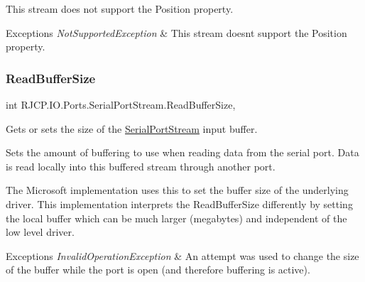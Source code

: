 This stream does not support the Position property. 


\begin{DoxyExceptions}{Exceptions}
{\em Not\+Supported\+Exception} & This stream doesn\textquotesingle{}t support the Position property.\\
\hline
\end{DoxyExceptions}
\mbox{\label{class_r_j_c_p_1_1_i_o_1_1_ports_1_1_serial_port_stream_a2f01d313972dcce89bc22372c44d85b1}} 
\subsubsection{\texorpdfstring{ReadBufferSize}{ReadBufferSize}}
{\footnotesize\ttfamily int R\+J\+C\+P.\+I\+O.\+Ports.\+Serial\+Port\+Stream.\+Read\+Buffer\+Size\hspace{0.3cm}{\ttfamily [get]}, {\ttfamily [set]}}



Gets or sets the size of the \mbox{\hyperlink{class_r_j_c_p_1_1_i_o_1_1_ports_1_1_serial_port_stream}{Serial\+Port\+Stream}} input buffer. 

Sets the amount of buffering to use when reading data from the serial port. Data is read locally into this buffered stream through another port. 

The Microsoft implementation uses this to set the buffer size of the underlying driver. This implementation interprets the Read\+Buffer\+Size differently by setting the local buffer which can be much larger (megabytes) and independent of the low level driver.


\begin{DoxyExceptions}{Exceptions}
{\em Invalid\+Operation\+Exception} & An attempt was used to change the size of the buffer while the port is open (and therefore buffering is active).\\
\hline
\end{DoxyExceptions}
\mbox{\label{class_r_j_c_p_1_1_i_o_1_1_ports_1_1_serial_port_stream_a2778ff533ee7133faba41c0d04d4f407}} 
